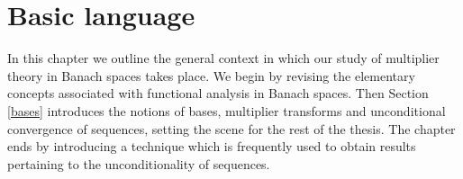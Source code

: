 \chapter{Basic language}
In this chapter we outline the general context in which our study of multiplier
theory in Banach spaces
takes place. We begin by revising the elementary concepts
associated with functional analysis in Banach spaces. Then Section \ref{bases}
introduces the notions of bases, multiplier transforms and unconditional
convergence of sequences, setting the scene for the rest of the thesis. The
chapter ends by introducing a technique which is frequently used to obtain
results pertaining to the unconditionality of sequences.
